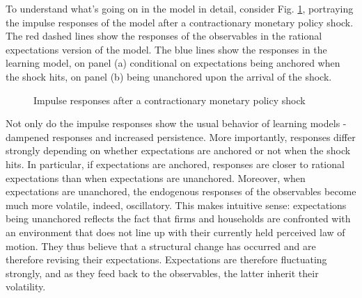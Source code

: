\documentclass[11pt]{article}
\def \myFigPath {../../figures/}
\renewcommand{\[}{\begin{equation}}
\renewcommand{\]}{\end{equation}}
\def\mySmallerFigScale{0.18}
\begin{document}
To understand what's going on in the model in detail, consider Fig. \ref{IRF}, portraying the impulse responses of the model after a contractionary monetary policy shock. The red dashed lines show the responses of the observables in the rational expectations version of the model. The blue lines show the responses in the learning model, on panel (a) conditional on expectations being anchored when the shock hits, on panel (b) being unanchored upon the arrival of the shock. 
\begin{figure}[h!]
\caption{Impulse responses after a contractionary monetary policy shock}
\label{IRF}
\end{figure}

Not only do the impulse responses show the usual behavior of learning models - dampened responses and increased persistence. More importantly, responses differ strongly depending on whether expectations are anchored or not when the shock hits. In particular, if expectations are anchored, responses are closer to rational expectations than when expectations are unanchored. Moreover, when expectations are unanchored, the endogenous responses of the observables become much more volatile, indeed, oscillatory. This makes intuitive sense: expectations being unanchored reflects the fact that firms and households are confronted with an environment that does not line up with their currently held perceived law of motion. They thus believe that a structural change has occurred and are therefore revising their expectations. Expectations are therefore fluctuating strongly, and as they feed back to the observables, the latter inherit their volatility. 
\end{document}
